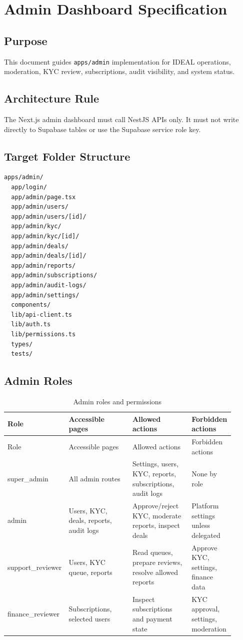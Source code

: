 \chapter*{Admin Dashboard Specification}

\section*{Purpose}
This document guides \texttt{apps/admin} implementation for IDEAL operations, moderation, KYC review, subscriptions, audit visibility, and system status.

\section*{Architecture Rule}
The Next.js admin dashboard must call NestJS APIs only. It must not write directly to Supabase tables or use the Supabase service role key.

\section*{Target Folder Structure}
\begin{verbatim}
apps/admin/
  app/login/
  app/admin/page.tsx
  app/admin/users/
  app/admin/users/[id]/
  app/admin/kyc/
  app/admin/kyc/[id]/
  app/admin/deals/
  app/admin/deals/[id]/
  app/admin/reports/
  app/admin/subscriptions/
  app/admin/audit-logs/
  app/admin/settings/
  components/
  lib/api-client.ts
  lib/auth.ts
  lib/permissions.ts
  types/
  tests/
\end{verbatim}

\section*{Admin Roles}
\begin{longtable}{p{0.18\linewidth}p{0.28\linewidth}p{0.26\linewidth}p{0.18\linewidth}}
\caption{Admin roles and permissions}\\
\toprule
Role & Accessible pages & Allowed actions & Forbidden actions \\
\midrule
\endfirsthead
\toprule
Role & Accessible pages & Allowed actions & Forbidden actions \\
\midrule
\endhead
super\_admin & All admin routes & Settings, users, KYC, reports, subscriptions, audit logs & None by role \\
admin & Users, KYC, deals, reports, audit logs & Approve/reject KYC, moderate reports, inspect deals & Platform settings unless delegated \\
support\_reviewer & Users, KYC queue, reports & Read queues, prepare reviews, resolve allowed reports & Approve KYC, settings, finance data \\
finance\_reviewer & Subscriptions, selected users & Inspect subscriptions and payment state & KYC approval, settings, moderation \\
\bottomrule
\end{longtable}

